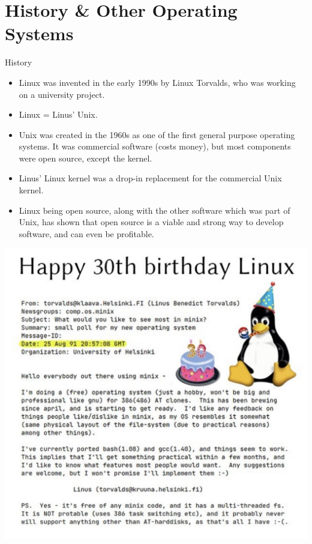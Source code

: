 \documentclass[graphics]{beamer}
\begin{document}
\section{History \& Other Operating Systems}
\begin{frame}{History}
     {
        \begin{itemize}
            \item Linux was invented in the early 1990s by Linux Torvalds, who was working on a university project.
            \item Linux = Linus' Unix.
            \item Unix was created in the 1960s as one of the first general purpose operating systems. It was commercial software (costs money), but most components were open source, except the kernel.
            \item Linus' Linux kernel was a drop-in replacement for the commercial Unix kernel.
            \item Linux being open source, along with the other software which was part of Unix, has shown that open source is a viable and strong way to develop software, and can even be profitable.
        \end{itemize}
    }
     {
        \includegraphics[scale=0.231]{Images/linux_birthday.jpg}
    }
\end{frame}
\end{document}
